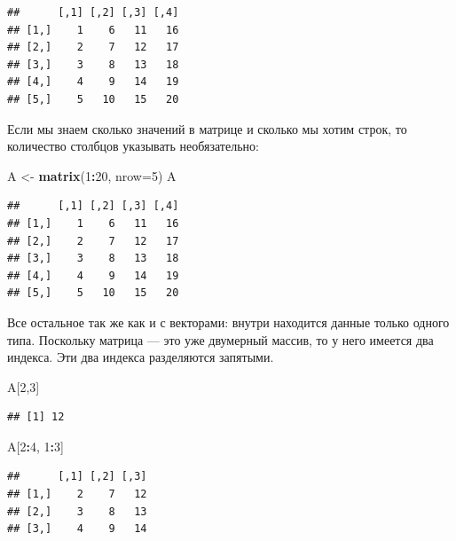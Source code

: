 \documentclass[]{book}
\newenvironment{Shaded}{\begin{snugshade}}{\end{snugshade}}
\newcommand{\KeywordTok}[1]{\textcolor[rgb]{0.13,0.29,0.53}{\textbf{#1}}}
\newcommand{\DataTypeTok}[1]{\textcolor[rgb]{0.13,0.29,0.53}{#1}}
\newcommand{\DecValTok}[1]{\textcolor[rgb]{0.00,0.00,0.81}{#1}}
\newcommand{\StringTok}[1]{\textcolor[rgb]{0.31,0.60,0.02}{#1}}
\newcommand{\OperatorTok}[1]{\textcolor[rgb]{0.81,0.36,0.00}{\textbf{#1}}}
\newcommand{\NormalTok}[1]{#1}
\begin{document}
\begin{verbatim}
##      [,1] [,2] [,3] [,4]
## [1,]    1    6   11   16
## [2,]    2    7   12   17
## [3,]    3    8   13   18
## [4,]    4    9   14   19
## [5,]    5   10   15   20
\end{verbatim}

Если мы знаем сколько значений в матрице и сколько мы хотим строк, то
количество столбцов указывать необязательно:

\begin{Shaded}
\begin{Highlighting}[]
\NormalTok{A <-}\StringTok{ }\KeywordTok{matrix}\NormalTok{(}\DecValTok{1}\OperatorTok{:}\DecValTok{20}\NormalTok{, }\DataTypeTok{nrow=}\DecValTok{5}\NormalTok{)}
\NormalTok{A}
\end{Highlighting}
\end{Shaded}

\begin{verbatim}
##      [,1] [,2] [,3] [,4]
## [1,]    1    6   11   16
## [2,]    2    7   12   17
## [3,]    3    8   13   18
## [4,]    4    9   14   19
## [5,]    5   10   15   20
\end{verbatim}

Все остальное так же как и с векторами: внутри находится данные только
одного типа. Поскольку матрица --- это уже двумерный массив, то у него
имеется два индекса. Эти два индекса разделяются запятыми.

\begin{Shaded}
\begin{Highlighting}[]
\NormalTok{A[}\DecValTok{2}\NormalTok{,}\DecValTok{3}\NormalTok{]}
\end{Highlighting}
\end{Shaded}

\begin{verbatim}
## [1] 12
\end{verbatim}

\begin{Shaded}
\begin{Highlighting}[]
\NormalTok{A[}\DecValTok{2}\OperatorTok{:}\DecValTok{4}\NormalTok{, }\DecValTok{1}\OperatorTok{:}\DecValTok{3}\NormalTok{]}
\end{Highlighting}
\end{Shaded}

\begin{verbatim}
##      [,1] [,2] [,3]
## [1,]    2    7   12
## [2,]    3    8   13
## [3,]    4    9   14
\end{verbatim}
\end{document}

